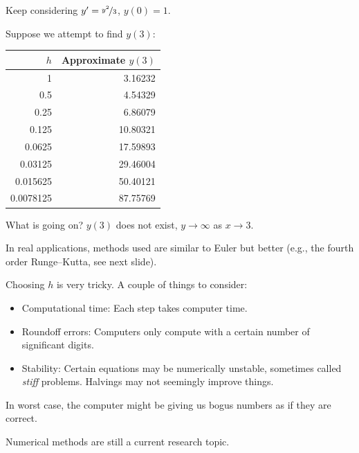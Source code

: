 \documentclass[10pt,aspectratio=169]{beamer}
\begin{document}
\begin{frame}
Keep considering
\quad $y' = \nicefrac{y^2}{3}$, \quad $y(0) = 1$.

\medskip
\pause

Suppose we attempt to find $y(3)$:

\begin{center}
\begin{tabular}{@{}rr@{}}
\toprule
$h$ & Approximate $y(3)$ \\
\midrule
1        & 3.16232 \\
0.5      & 4.54329 \\
0.25     & 6.86079 \\
0.125    & 10.80321 \\
0.0625   & 17.59893 \\
0.03125  & 29.46004 \\
0.015625 & 50.40121 \\
0.0078125& 87.75769 \\
\bottomrule
\end{tabular}
\end{center}

\pause
What is going on? \pause $y(3)$ does not exist, \pause $y \to \infty$ as $x \to 3$.

\end{frame}

\begin{frame}

In real applications, methods used are similar to Euler
but better (e.g., the fourth order Runge--Kutta, see next slide).

\medskip
\pause

Choosing $h$ is very tricky.  A couple of things to consider:

\begin{itemize}
\item
\pause
Computational time: Each step takes computer time.
\item
\pause
Roundoff errors: Computers only compute with a certain number of
significant digits.
\item
\pause
Stability: Certain equations may be numerically unstable, sometimes
called \emph{stiff} problems.  Halvings may not seemingly improve things.
\end{itemize}

\medskip
\pause

In worst case, the computer might be giving us bogus numbers as if they are
correct.

\medskip
\pause

Numerical methods are still a current research topic.
\end{frame}
\end{document}
